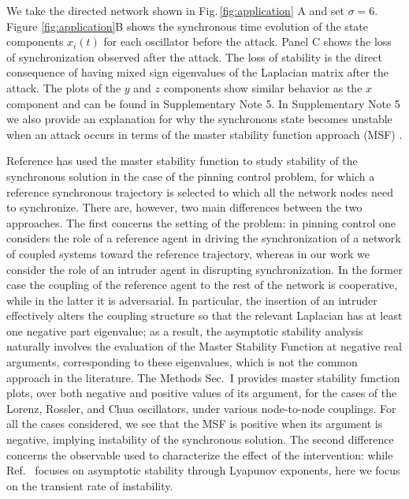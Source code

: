 \documentclass[%
 reprint,
 amsmath,amssymb,
 aip,
]{revtex4-2}
\theoremstyle{italichead}
\theoremstyle{definition}
\begin{document}
{We take the directed network shown in Fig.\,\ref{fig:application} A and set $\sigma=6$.
Figure \ref{fig:application}B shows the synchronous time evolution of the state components $x_i(t)$ for each oscillator before the attack. Panel C shows the loss of synchronization observed after the attack.
The loss of stability is the direct consequence of having mixed sign eigenvalues of the Laplacian matrix after the attack. 
The plots of the $y$ and $z$ components show similar behavior as the $x$ component and can be found in Supplementary Note 5. 
In Supplementary Note 5 we also provide an explanation for why the synchronous state becomes unstable when an attack occurs in terms of the {master stability function approach (MSF) \cite{fujisaka1983stability,pecora1998master}}. 


Reference \cite{sorrentino2007controllability} has used the master stability function to study stability of the synchronous solution in the case of the pinning control problem, for which a reference synchronous trajectory is selected to which all the network nodes need to synchronize. 
{There are, however, two main differences between the two approaches.} { {The first concerns the setting of the problem:} in pinning control one {considers} the role of a reference agent in driving the synchronization of a network of coupled systems {toward} the reference trajectory, whereas in our work {we consider} the role of an intruder agent in disrupting synchronization. In the former case the coupling of the reference agent to the rest of the network is cooperative, %
while in the latter it is adversarial. %
{In particular, the insertion of an intruder effectively alters the coupling structure so that the relevant Laplacian has at least one negative part eigenvalue; as a result, the asymptotic stability analysis naturally involves the evaluation of the Master Stability Function at negative real arguments, corresponding to these eigenvalues, which is not the common approach in the literature. } The Methods Sec.\ I provides master stability function plots, over both negative and positive values of its argument, for the cases of the Lorenz, Rossler, and Chua oscillators, under various node-to-node couplings. For all the cases considered, we see that the MSF is positive when its argument is negative, implying instability of the synchronous solution.
{The second difference concerns the observable used to characterize the effect of the intervention: while Ref.\ \cite{sorrentino2007controllability} focuses on asymptotic stability through Lyapunov exponents, here we focus on the transient rate of instability. }} %






}
\end{document}
